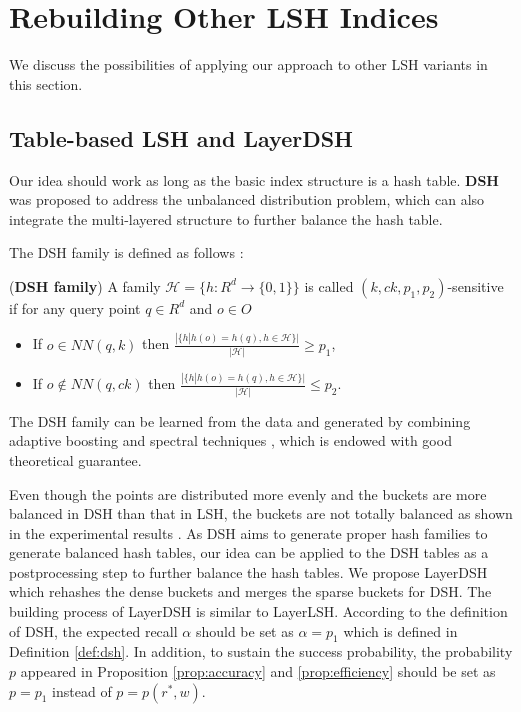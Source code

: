 \section{Rebuilding Other LSH Indices}
\label{sec:extension}

We discuss the possibilities of applying our approach to other LSH variants in this section.

\subsection{Table-based LSH and LayerDSH}
\label{sec:extension:dsh}

Our idea should work as long as the basic index structure is a hash table. \textbf{DSH} \cite{Gao:2014:DDS:2588555.2588565} was proposed to address the unbalanced distribution problem, which can also integrate the multi-layered structure to further balance the hash table.


 The DSH family is defined as follows \cite{Gao:2014:DDS:2588555.2588565}:
\begin{definition}
\label{def:dsh}
(\textbf{DSH family}) A family $\mathcal{H}=\{h:R^d\rightarrow\{0,1\}\}$ is called $(k,ck,p_1,p_2)$-sensitive if for any query point $q\in R^d$ and $o\in O$
\begin{itemize}
  \item If $o\in NN(q,k)$ then $\frac{|\{h|h(o)=h(q),h\in\mathcal{H}\}|}{|\mathcal{H}|}\geq p_1$,
  \item If $o\notin NN(q,ck)$ then $\frac{|\{h|h(o)=h(q),h\in\mathcal{H}\}|}{|\mathcal{H}|}\leq p_2$.
\end{itemize}
\end{definition}
The DSH family can be learned from the data and generated by combining adaptive boosting and spectral techniques \cite{Gao:2014:DDS:2588555.2588565}, which is endowed with good theoretical guarantee.

Even though the points are distributed more evenly and the buckets are more balanced in DSH than that in LSH, the buckets are not totally balanced as shown in the experimental results \cite{Gao:2014:DDS:2588555.2588565}. As DSH aims to generate proper hash families to generate balanced hash tables, our idea can be applied to the DSH tables as a postprocessing step to further balance the hash tables. We propose LayerDSH which rehashes the dense buckets and merges the sparse buckets for DSH. The building process of LayerDSH is similar to LayerLSH. According to the definition of DSH, the expected recall $\alpha$ should be set as $\alpha=p_1$ which is defined in Definition \ref{def:dsh}. In addition, to sustain the success probability, the probability $p$ appeared in Proposition \ref{prop:accuracy} and \ref{prop:efficiency} should be set as $p=p_1$ instead of $p=p(r^*,w)$.


